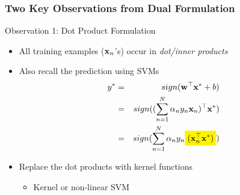 \documentclass[10pt]{beamer}
\newcommand{\hilightbox}[1]{%
  \colorbox{yellow}{$\displaystyle#1$}}
\begin{document}
\begin{frame}
      {
        \frametitle{Two Key Observations from Dual Formulation}
      }
      \begin{block}{Observation 1: Dot Product Formulation}
        \begin{itemize}
          \item All training examples (${\bf x}_n$'s) occur in {\em dot/inner products}
          \item Also recall the prediction using SVMs
            \begin{eqnarray*}
              y^* & = & sign({\bf w}^\top{\bf x}^* + b)\\
              & = & sign((\sum_{n=1}^N\alpha_ny_n{\bf x}_n)^\top{\bf x}^*)\\
              & = & sign(\sum_{n=1}^N\alpha_ny_n\hilightbox{({\bf x}_n^\top{\bf x}^*)})
            \end{eqnarray*}
          \item Replace the dot products with kernel functions
            \begin{itemize}
              \item Kernel or non-linear SVM
            \end{itemize}
        \end{itemize}
      \end{block}
\end{frame}
\end{document}
